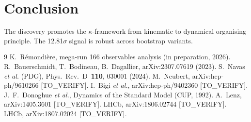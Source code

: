 \documentclass[reprint,amsmath,amssymb,aps,prl,superscriptaddress,nofootinbib]{revtex4-2}
\begin{document}
\section{Conclusion}
The discovery promotes the $\kappa$-framework from kinematic to dynamical organising principle. The 12.81$\sigma$ signal is robust across bootstrap variants.

\begin{thebibliography}{9}
K.~R\'emondi\`ere, mega-run 166 observables analysis (in preparation, 2026).
R.~Bauerschmidt, T.~Bodineau, B.~Dagallier, arXiv:2307.07619 (2023).
S.~Navas \emph{et al.} (PDG), Phys.~Rev.~D~\textbf{110}, 030001 (2024).
M.~Neubert, arXiv:hep-ph/9610266 [TO\_VERIFY].
I.~Bigi \emph{et al.}, arXiv:hep-ph/9402360 [TO\_VERIFY].
J.~F.~Donoghue \emph{et al.}, Dynamics of the Standard Model (CUP, 1992).
A.~Lenz, arXiv:1405.3601 [TO\_VERIFY].
LHCb, arXiv:1806.02744 [TO\_VERIFY].
LHCb, arXiv:1807.02024 [TO\_VERIFY].
\end{thebibliography}
\end{document}

